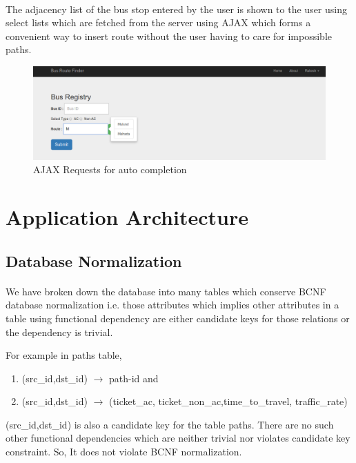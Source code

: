 \documentclass[11pt]{article}
\begin{document}
\paragraph{}	

The adjacency list of the bus stop entered by the user is shown to the user using select lists which are fetched from the server using AJAX which forms a convenient way to insert route without the user having to care for impossible paths. 

\begin{figure}[ht!]
\center
\includegraphics[scale = 0.36]{shots/ajaxreq.png}
\caption{AJAX Requests for auto completion}
\label{overflow}
\end{figure}


\section{Application Architecture}

\subsection{Database Normalization}
\paragraph{}

We have broken down the database into many tables which conserve BCNF database normalization i.e. those attributes which implies other attributes in a table using functional dependency are either candidate keys for those relations or the dependency is trivial. 

For example in paths table, 
\begin{enumerate}
\item (src\_id,dst\_id) $\rightarrow$ path-id and 
\item (src\_id,dst\_id) $\rightarrow$ (ticket\_ac, ticket\_non\_ac,time\_to\_travel, traffic\_rate) 
\end{enumerate}
(src\_id,dst\_id) is also a candidate key for the table paths. There are no such other functional dependencies which are neither trivial nor violates  candidate key constraint. So, It does not violate BCNF normalization.  
\end{document}
